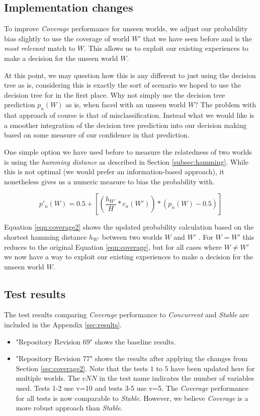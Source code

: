 \documentclass[a4paper]{article}
\newcommand{\cc}{\emph{Concurrent}\xspace}
\newcommand{\st}{\emph{Stable}\xspace}
\newcommand{\cov}{\emph{Coverage}\xspace}
\newcommand{\dt}{{decision tree}\xspace}
\begin{document}
\subsection{Implementation changes}

To improve \cov performance for unseen worlds, we adjust our probability bias slightly to use the coverage of world $W'$ that we have seen before and is the \textit{most relevant} match to $W$. This allows us to exploit our existing experiences to make a decision for the unseen world $W$. 

At this point, we may question how this is any different to just using the \dt as is, considering this is exactly the sort of scenario we hoped to use the decision tree for in the first place. Why not simply use the \dt prediction $p_n(W)$ as is, when faced with an unseen world $W$? The problem with that approach of course is that of misclassification. Instead what we would like is a smoother integration of the \dt prediction into our decision making based on some measure of our confidence in that prediction.

One simple option we have used before to measure the relatedness of two worlds is using the \textit{hamming distance} as described in Section \ref{subsec:hamming}. While this is not optimal (we would prefer an information-based approach), it nonetheless gives us a numeric measure to bias the probability with.


\begin{equation}
\label{eqn:coverage2}   
p'_n(W)= 0.5 + \left[  \left( \frac{h_{W'}}{H} * c_n(W') \right) *  \left( p_n(W) - 0.5 \right)  \right]
\end{equation}

Equation \ref{eqn:coverage2} shows the updated probability calculation based on the shortest hamming distance $h_{W'}$ between two worlds $W$ and $W'$ . For $W = W'$ this reduces to the original Equation \ref{eqn:coverage}, but for all cases where $W \ne W'$ we now have a way to exploit our existing experiences to make a decision for the unseen world $W$. 

\subsection{Test results}


The test results comparing \cov performance to \cc and \st are included in the Appendix \ref{sec:results}.
\begin{itemize}
\item "Repository Revision 69" shows the baseline results.
\item "Repository Revision 77" shows the results after applying the changes from Section \ref{sec:coverage2}. Note that the tests $1$ to $5$ have been updated here for multiple worlds. The $vNN$ in the test name indicates the number of variables used. Tests 1-2 use v=10 and tests 3-5 use v=5. The \cov performance for all tests is now comparable to \st. However, we believe \cov is a more robust approach than \st. 
\end{itemize}
\end{document}
